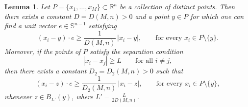 \documentclass[11pt,letterpaper,reqno]{amsart}
\theoremstyle{plain}%
\newtheorem{lemma}[theorem]{Lemma}
\theoremstyle{definition}
\numberwithin{equation}{section}
\numberwithin{figure}{section}
\begin{document}
\begin{lemma}\label{lemma ch}
Let \(P=\{x_1,\dots,x_M\}\subset \mathbb{R}^n\) be a collection of distinct points. 
Then there exists a constant \(D=D(M,n)>0\) and a point \(y\in P\) for which one can find a unit vector \(e\in \mathbb{S}^{n-1}\) satisfying
\begin{equation}\label{eq hyper bound}
(x_i-y)\cdot e 
\ge 
\frac{1}{D(M,n)}\,|x_i-y|,
\qquad 
\text{for every } x_i\in P\setminus\{y\}.
\end{equation}
Moreover, if the points of \(P\) satisfy the separation condition
\[
|x_i-x_j|\ge L 
\qquad \text{for all } i\ne j,
\]
then there exists a constant \(D_2=D_2(M,n)>0\) such that
\begin{equation}\label{eq hyper bound neigh}
(x_i-z)\cdot e 
\ge 
\frac{1}{D_2(M,n)}\,|x_i-z|,
\qquad 
\text{for every } x_i\in P\setminus\{y\},
\end{equation}
whenever \(z\in B_{L'}(y)\), where \(L'=\frac{L}{2D(M,n)}\).
\end{lemma}
\end{document}
